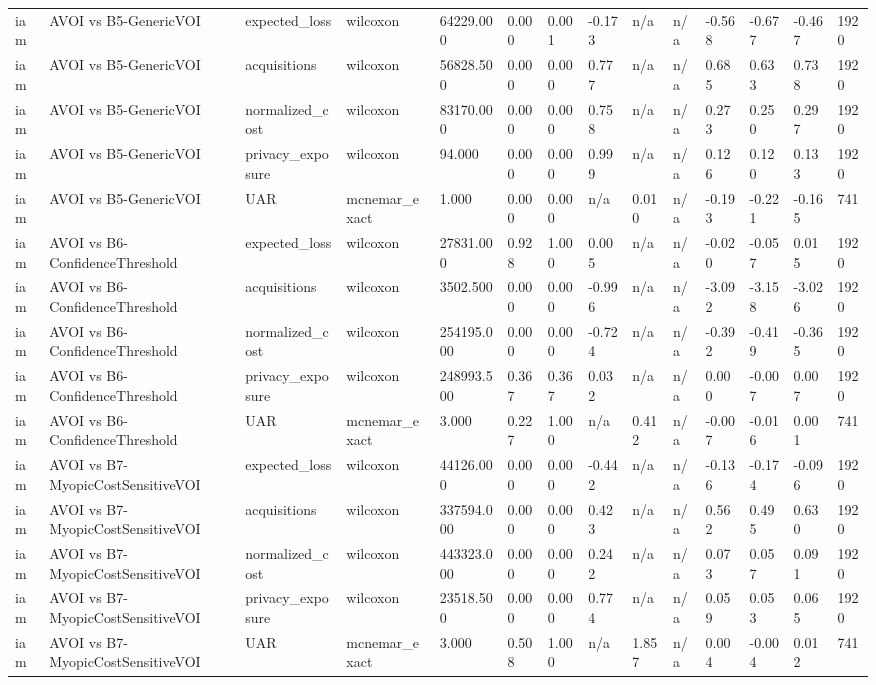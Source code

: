 \begin{table}[!ht]
{\begin{tabular}{llllllllllllll}
iam & AVOI vs B5-GenericVOI & expected\_loss & wilcoxon & 64229.000 & 0.000 & 0.001 & -0.173 & n/a & n/a & -0.568 & -0.677 & -0.467 & 1920 \\
iam & AVOI vs B5-GenericVOI & acquisitions & wilcoxon & 56828.500 & 0.000 & 0.000 & 0.777 & n/a & n/a & 0.685 & 0.633 & 0.738 & 1920 \\
iam & AVOI vs B5-GenericVOI & normalized\_cost & wilcoxon & 83170.000 & 0.000 & 0.000 & 0.758 & n/a & n/a & 0.273 & 0.250 & 0.297 & 1920 \\
iam & AVOI vs B5-GenericVOI & privacy\_exposure & wilcoxon & 94.000 & 0.000 & 0.000 & 0.999 & n/a & n/a & 0.126 & 0.120 & 0.133 & 1920 \\
iam & AVOI vs B5-GenericVOI & UAR & mcnemar\_exact & 1.000 & 0.000 & 0.000 & n/a & 0.010 & n/a & -0.193 & -0.221 & -0.165 & 741 \\
iam & AVOI vs B6-ConfidenceThreshold & expected\_loss & wilcoxon & 27831.000 & 0.928 & 1.000 & 0.005 & n/a & n/a & -0.020 & -0.057 & 0.015 & 1920 \\
iam & AVOI vs B6-ConfidenceThreshold & acquisitions & wilcoxon & 3502.500 & 0.000 & 0.000 & -0.996 & n/a & n/a & -3.092 & -3.158 & -3.026 & 1920 \\
iam & AVOI vs B6-ConfidenceThreshold & normalized\_cost & wilcoxon & 254195.000 & 0.000 & 0.000 & -0.724 & n/a & n/a & -0.392 & -0.419 & -0.365 & 1920 \\
iam & AVOI vs B6-ConfidenceThreshold & privacy\_exposure & wilcoxon & 248993.500 & 0.367 & 0.367 & 0.032 & n/a & n/a & 0.000 & -0.007 & 0.007 & 1920 \\
iam & AVOI vs B6-ConfidenceThreshold & UAR & mcnemar\_exact & 3.000 & 0.227 & 1.000 & n/a & 0.412 & n/a & -0.007 & -0.016 & 0.001 & 741 \\
iam & AVOI vs B7-MyopicCostSensitiveVOI & expected\_loss & wilcoxon & 44126.000 & 0.000 & 0.000 & -0.442 & n/a & n/a & -0.136 & -0.174 & -0.096 & 1920 \\
iam & AVOI vs B7-MyopicCostSensitiveVOI & acquisitions & wilcoxon & 337594.000 & 0.000 & 0.000 & 0.423 & n/a & n/a & 0.562 & 0.495 & 0.630 & 1920 \\
iam & AVOI vs B7-MyopicCostSensitiveVOI & normalized\_cost & wilcoxon & 443323.000 & 0.000 & 0.000 & 0.242 & n/a & n/a & 0.073 & 0.057 & 0.091 & 1920 \\
iam & AVOI vs B7-MyopicCostSensitiveVOI & privacy\_exposure & wilcoxon & 23518.500 & 0.000 & 0.000 & 0.774 & n/a & n/a & 0.059 & 0.053 & 0.065 & 1920 \\
iam & AVOI vs B7-MyopicCostSensitiveVOI & UAR & mcnemar\_exact & 3.000 & 0.508 & 1.000 & n/a & 1.857 & n/a & 0.004 & -0.004 & 0.012 & 741 \\

\end{tabular}}
\end{table}
